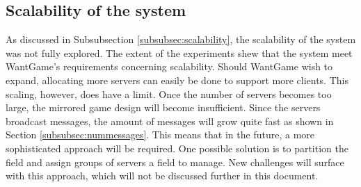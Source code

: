 	\subsection{Scalability of the system}
	\label{subsec:scalability_system_discussion}
		As discussed in Subsubsection \ref{subsubsec:scalability}, the scalability of the system was not fully explored. 
		The extent of the experiments shew that the system meet WantGame's requirements concerning scalability. 
		Should WantGame wish to expand, allocating more servers can easily be done to support more clients. 
		This scaling, however, does have a limit. Once the number of servers becomes too large, the mirrored game design will become insufficient.
		Since the servers broadcast messages, the amount of messages will grow quite fast as shown in Section \ref{subsubsec:nummessages}. This means that in the future, a more sophisticated approach will be required. 
		One possible solution is to partition the field and assign groups of servers a field to manage. 
		New challenges will surface with this approach, which will not be discussed further in this document. 